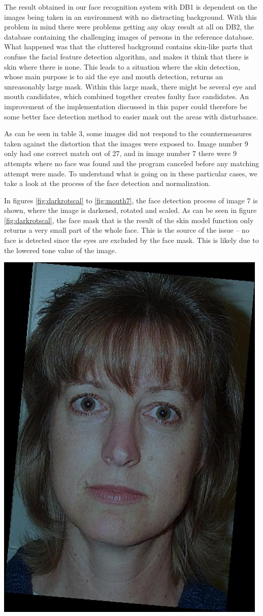 The result obtained in our face recognition system with DB1 is dependent on the images being taken in an environment with no distracting background. With this problem in mind there were problems getting any okay result at all on DB2, the database containing the challenging images of persons in the reference database. What happened was that the cluttered background contains skin-like parts that confuse the facial feature detection algorithm, and makes it think that there is skin where there is none. This leads to a situation where the skin detection, whose main purpose is to aid the eye and mouth detection, returns an unreasonably large mask. Within this large mask, there might be several eye and mouth candidates, which combined together creates faulty face candidates. An improvement of the implementation discussed in this paper could therefore be some better face detection method to easier mask out the areas with disturbance.

As can be seen in table 3, some images did not respond to the countermeasures taken against the distortion that the images were exposed to. Image number 9 only had one correct match out of 27, and in image number 7 there were 9 attempts where no face was found and the program canceled before any matching attempt were made. To understand what is going on in these particular cases, we take a look at the process of the face detection and normalization.


In figures \ref{fig:darkrotscal} to \ref{fig:mouth7}, the face detection process of image 7 is shown, where the image is darkened, rotated and scaled. As can be seen in figure \ref{fig:darkrotscal}, the face mask that is the result of the skin model function only returns a very small part of the whole face. This is the source of the issue – no face is detected since the eyes are excluded by the face mask. This is likely due to the lowered tone value of the image. 


\begin{Figure}
  \centering
    \includegraphics[width=0.5\columnwidth]{images/im7_img.jpg}
\end{Figure}

